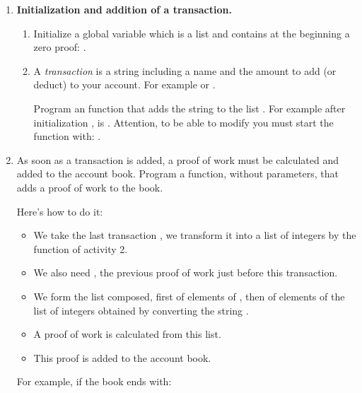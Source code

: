 \documentclass[11pt,class=report,crop=false]{standalone}
\begin{document}
\begin{activite}




\begin{enumerate}
  \item \textbf{Initialization and addition of a transaction.}
  
  \begin{enumerate}
    \item Initialize a global  variable which is a list and contains at the beginning a zero proof:  .
  
    \item A \emph{transaction} is a string including a name and the amount to add (or deduct) to your account. For example  or .
    
    Program an  function that adds the string  to the list . 
For example after initialization ,  
     is \ci{[ [0,0,0,0,0,0], "Camille +100" ]}.
    Attention, to be able to modify  you must start the function with: .
    
  \end{enumerate} 
  
   \item As soon as a transaction is added, a proof of work must be calculated and added to the account book. Program a  function, without parameters, that adds a proof of work to the book.   
   
Here's how to do it:
  \begin{itemize}
    \item We take the last transaction , we transform it into a list of integers by the  function of activity 2.
    \item We also need , the previous proof of work just before this transaction.
    \item We form the  list composed, first of elements of , then of elements of the list of integers obtained by converting the string .
    \item A proof of work is calculated from this list.
    \item This proof is added to the account book.
  \end{itemize}
  For example, if the book ends with:
  

\end{enumerate}
\end{activite}
\end{document}
